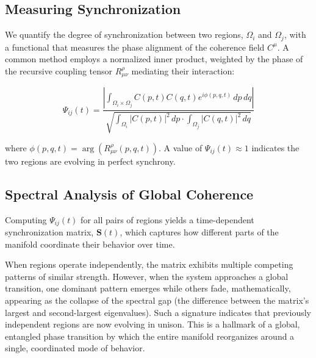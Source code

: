 
\subsection{Measuring Synchronization}
\label{11.4.1:measuring_synchronization}

We quantify the degree of synchronization between two regions, \(\Omega_i\) and \(\Omega_j\), with a functional that measures the phase alignment of the coherence field \(C^\mu\). A common method employs a normalized inner product, weighted by the phase of the recursive coupling tensor \(R^\rho_{\mu\nu}\) mediating their interaction:

\begin{equation}
\Psi_{ij}(t) = \frac{\left|\int_{\Omega_i \times \Omega_j} C(p,t)C(q,t)e^{i\phi(p,q,t)} \, dp \, dq\right|}{\sqrt{\int_{\Omega_i} |C(p,t)|^2 \, dp \cdot \int_{\Omega_j} |C(q,t)|^2 \, dq}}
\end{equation}

where \(\phi(p,q,t) = \arg(R^\rho_{\mu\nu}(p,q,t))\). A value of \(\Psi_{ij}(t) \approx 1\) indicates the two regions are evolving in perfect synchrony.


\subsection{Spectral Analysis of Global Coherence}
\label{11.4.2:spectral_analysis_of_global_coherence}

Computing \(\Psi_{ij}(t)\) for all pairs of regions yields a time-dependent synchronization matrix, \(\mathbf{S}(t)\), which captures how different parts of the manifold coordinate their behavior over time. 

When regions operate independently, the matrix exhibits multiple competing patterns of similar strength. However, when the system approaches a global transition, one dominant pattern emerges while others fade, mathematically, appearing as the collapse of the spectral gap (the difference between the matrix's largest and second-largest eigenvalues). Such a signature indicates that previously independent regions are now evolving in unison. This is a hallmark of a global, entangled phase transition by which the entire manifold reorganizes around a single, coordinated mode of behavior. 